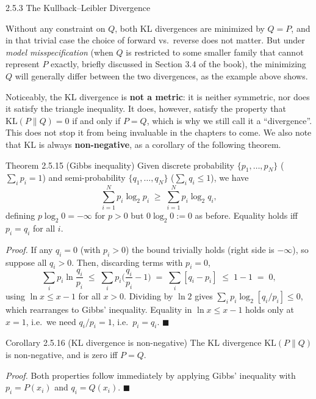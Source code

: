 \documentclass[aspectratio=169,10pt]{beamer}
\begin{document}
\begin{frame}[allowframebreaks]{2.5.3 The Kullback--Leibler Divergence}
\framebreak

Without any constraint on $Q$, both KL divergences are minimized by $Q=P$,
and in that trivial case the choice of forward vs.\ reverse does not matter.
But under \emph{model misspecification} (when $Q$ is restricted to some
smaller family that cannot represent $P$ exactly, briefly discussed in
Section 3.4 of the book), the minimizing $Q$ will generally differ between
the two divergences, as the example above shows.

Noticeably, the KL divergence is \textbf{not a metric}: it is neither
symmetric, nor does it satisfy the triangle inequality. It does, however,
satisfy the property that $\mathrm{KL}(P\|Q) = 0$ if and only if $P=Q$,
which is why we still call it a ``divergence''. This does not stop it from
being invaluable in the chapters to come. We also note that KL is always
\textbf{non-negative}, as a corollary of the following theorem.

\framebreak

\begin{block}{Theorem 2.5.15 (Gibbs inequality)}
Given discrete probability $\{p_1,\ldots,p_N\}$ ($\sum_i p_i = 1$) and
semi-probability $\{q_1,\ldots,q_N\}$ ($\sum_i q_i \leq 1$), we have
\[
  \sum_{i=1}^{N} p_i \log_2 p_i \;\geq\; \sum_{i=1}^{N} p_i \log_2 q_i,
\]
defining $p\log_2 0 = -\infty$ for $p>0$ but $0\log_2 0 := 0$ as before.
Equality holds iff $p_i = q_i$ for all $i$.
\end{block}

\textit{Proof.} If any $q_i=0$ (with $p_i > 0$) the bound trivially holds
(right side is $-\infty$), so suppose all $q_i > 0$. Then, discarding terms
with $p_i = 0$,
\[
  \sum_i p_i \ln\frac{q_i}{p_i} \;\leq\; \sum_i p_i\Big(\frac{q_i}{p_i}-1\Big) \;=\; \sum_i [q_i - p_i] \;\leq\; 1-1 \;=\; 0,
\]
using $\ln x \leq x-1$ for all $x>0$. Dividing by $\ln 2$ gives $\sum_i p_i
\log_2[q_i/p_i] \leq 0$, which rearranges to Gibbs' inequality. Equality in
$\ln x \le x - 1$ holds only at $x=1$, i.e.\ we need $q_i/p_i = 1$, i.e.\
$p_i = q_i$. $\blacksquare$

\begin{block}{Corollary 2.5.16 (KL divergence is non-negative)}
The KL divergence $\mathrm{KL}(P\|Q)$ is non-negative, and is zero iff
$P=Q$.
\end{block}

\textit{Proof.} Both properties follow immediately by applying Gibbs'
inequality with $p_i = P(x_i)$ and $q_i = Q(x_i)$. $\blacksquare$
\end{frame}
\end{document}
